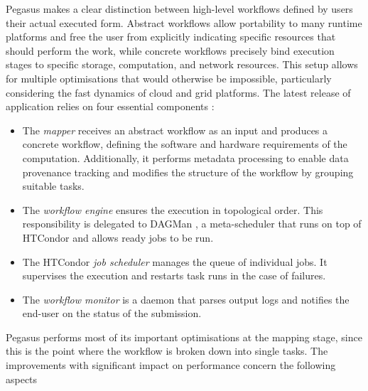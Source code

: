 \documentclass[11pt,a4paper]{report}
\begin{document}
Pegasus makes a clear distinction between high-level workflows defined by users their actual executed form. Abstract workflows allow portability to many runtime platforms and free the user from explicitly indicating specific resources that should perform the work, while concrete workflows precisely bind execution stages to specific storage, computation, and network resources. This setup allows for multiple optimisations that would otherwise be impossible, particularly considering the fast dynamics of cloud and grid platforms. The latest release of application relies on four essential components \cite{Deelman2013, Deelman2016}:

\begin{itemize}
	\item The \textit{mapper} receives an abstract workflow as an input and produces a concrete workflow, defining the software and hardware requirements of the computation. Additionally, it performs metadata processing to enable data provenance tracking and modifies the structure of the workflow by grouping suitable tasks.
	\item The \textit{workflow engine} ensures the execution in topological order. This responsibility is delegated to DAGMan \cite{DAGMan}, a meta-scheduler that runs on top of HTCondor \cite{HTCondor} and allows ready jobs to be run.
	\item The HTCondor \textit{job scheduler} manages the queue of individual jobs. It supervises the execution and restarts task runs in the case of failures.
	\item The \textit{workflow monitor} is a daemon that parses output logs and notifies the end-user on the status of the submission.
\end{itemize}

Pegasus performs most of its important optimisations at the mapping stage, since this is the point where the workflow is broken down into single tasks. The improvements with significant impact on performance concern the following aspects \cite{Deelman2016}
\end{document}
